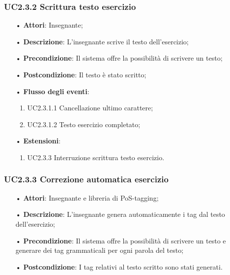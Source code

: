 \subsubsection{UC2.3.2 Scrittura testo esercizio}
\begin{itemize}
	\item[•] \textbf{Attori}: Insegnante;
	\item[•] \textbf{Descrizione}: L'insegnante scrive il testo dell’esercizio;
	\item[•] \textbf{Precondizione}: Il sistema offre la possibilità di scrivere un testo;
	\item[•] \textbf{Postcondizione}: Il testo è stato scritto;
	\item[•] \textbf{Flusso degli eventi}:
	\begin{enumerate}
		\item UC2.3.1.1	Cancellazione ultimo carattere;
		\item UC2.3.1.2	Testo esercizio completato;
	\end{enumerate}
	\item[•] \textbf{Estensioni}:	
	\begin{enumerate}
		\item UC2.3.3 Interruzione scrittura testo esercizio.
	\end{enumerate}
\end{itemize}


\subsubsection{UC2.3.3	Correzione automatica esercizio}
\begin{itemize}
	\item[•] \textbf{Attori}: Insegnante e libreria di PoS-tagging;
	\item[•] \textbf{Descrizione}: L’insegnante genera automaticamente i tag dal testo dell’esercizio;
	\item[•] \textbf{Precondizione}: Il sistema offre la possibilità di scrivere un testo e generare dei tag grammaticali per ogni parola del testo;
	\item[•] \textbf{Postcondizione}: I tag relativi al testo scritto sono stati generati.
\end{itemize}

